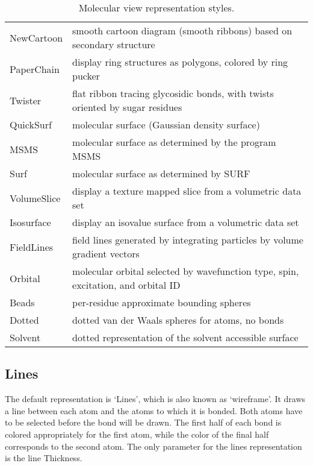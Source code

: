 \begin{table}[htb]
\begin{tabular}{|l|l|}
  NewCartoon	& smooth cartoon diagram (smooth ribbons) based on secondary structure \\
  PaperChain    & display ring structures as polygons, colored by ring pucker \\
  Twister       & flat ribbon tracing glycosidic bonds, with twists oriented by sugar residues \\
  QuickSurf     & molecular surface (Gaussian density surface) \\
  MSMS		& molecular surface as determined by the program MSMS \\
  Surf		& molecular surface as determined by SURF \\
  VolumeSlice   & display a texture mapped slice from a volumetric data set \\
  Isosurface    & display an isovalue surface from a volumetric data set \\
  FieldLines    & field lines generated by integrating particles by volume gradient vectors \\
  Orbital       & molecular orbital selected by wavefunction type, spin, excitation, and orbital ID \\
  Beads         & per-residue approximate bounding spheres \\
  Dotted	& dotted van der Waals spheres for atoms, no bonds \\
  Solvent       & dotted representation of the solvent accessible surface \\
  \end{tabular}
  \caption{Molecular view representation styles.}
  \label{table:ug:drawmethods}
\end{table}


\subsection{Lines}
\label{ug:topic:drawmethods:lines}
The default representation is `Lines', which is also known as
`wireframe'.
It draws a line between each atom and the atoms to which
it is bonded.  Both atoms have to be selected before the bond will be
drawn.  The first half of each bond is colored appropriately for the
first atom, while the color of the final half corresponds to the
second atom.  The only parameter for the lines representation is 
the line {\sf Thickness}.  


